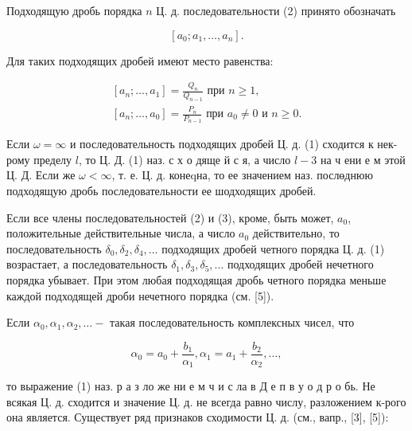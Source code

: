 \documentclass[10pt]{article}
\begin{document}
Подходящую дробь порядка $n$ Ц. д. последовательности (2) принято обозначать



\[

\left[a_{0} ; a_{1}, \ldots, a_{n}\right] .

\]



Для таких подходящих дробей имеют место равенства:



\[

\begin{gathered}

{\left[a_{n} ; \ldots, a_{1}\right]=\frac{Q_{n}}{Q_{n-1}} \text { при } n \geqslant 1,} \\

{\left[a_{n} ; \ldots, a_{0}\right]=\frac{P_{n}}{P_{n-1}} \text { при } a_{0} \neq 0 \text { и } n \geqslant 0 .}

\end{gathered}

\]



Если $\omega=\infty$ и последовательность подходящих дробей Ц. д. (1) сходится к нек-рому пределу $l$, то Ц. Д. (1) наз. с х о дяще й с я, а число $l-3$ на ч ени е м этой Ц. Д. Если же $\omega<\infty$, т. е. Ц. д. конеqна, то ее значением наз. послөднюю подходящую дробь последовательности ее шодходящих дробей.



Если все члены последовательностей (2) и (3), кроме, быть может, $a_{0}$, положительные действительные числа, а число $a_{0}$ действительно, то последовательность $\delta_{0}, \delta_{2}, \delta_{4}, \ldots$ подходящих дробей четного порядка Ц. д. (1) возрастает, а последовательность $\delta_{1}, \delta_{3}, \delta_{5}, \ldots$ подходящих дробей нечетного порядка убывает. При этом любая подходящая дробь четного порядка меньше каждой подходящей дроби нечетного порядка (см. [5]).



Если $\alpha_{0}, \alpha_{1}, \alpha_{2}, \ldots-$ такая последовательность комплексных чисел, что



\[

\alpha_{0}=a_{0}+\frac{b_{1}}{\alpha_{1}}, \alpha_{1}=a_{1}+\frac{b_{2}}{\alpha_{2}}, \ldots,

\]



то выражение (1) наз. р а з ло же ни е м ч и с ла в Д е п в у о д р о бь. Не всякая Ц. д. сходится и значение Ц. д. не всегда равно числу, разложением к-рого она является. Существует ряд признаков сходимости Ц. д. (см., вапр., [3], [5]):
\end{document}
